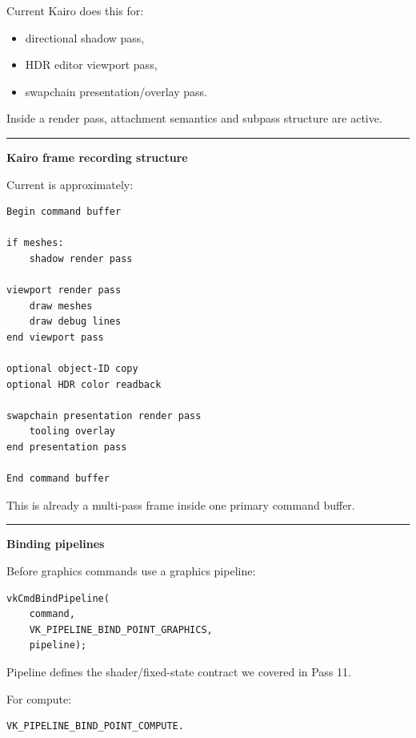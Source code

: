 Current Kairo does this for:

\begin{itemize}
\tightlist
\item
  directional shadow pass,
\item
  HDR editor viewport pass,
\item
  swapchain presentation/overlay pass.
\end{itemize}

Inside a render pass, attachment semantics and subpass structure are active.

\begin{center}\rule{0.5\linewidth}{0.5pt}\end{center}

\textbf{Kairo frame recording structure}

Current  is approximately:

\begin{verbatim}
Begin command buffer

if meshes:
    shadow render pass

viewport render pass
    draw meshes
    draw debug lines
end viewport pass

optional object-ID copy
optional HDR color readback

swapchain presentation render pass
    tooling overlay
end presentation pass

End command buffer
\end{verbatim}

This is already a multi-pass frame inside one primary command buffer.

\begin{center}\rule{0.5\linewidth}{0.5pt}\end{center}

\textbf{Binding pipelines}

Before graphics commands use a graphics pipeline:

\begin{verbatim}
vkCmdBindPipeline(
    command,
    VK_PIPELINE_BIND_POINT_GRAPHICS,
    pipeline);
\end{verbatim}

Pipeline defines the shader/fixed-state contract we covered in Pass 11.

For compute:

\begin{verbatim}
VK_PIPELINE_BIND_POINT_COMPUTE.
\end{verbatim}

